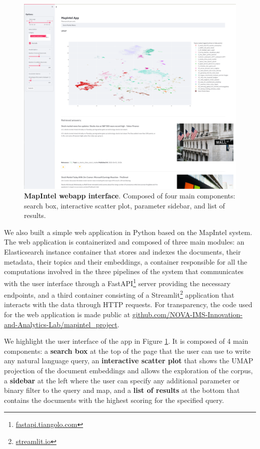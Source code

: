 \documentclass[a4paper]{article}
\begin{document}
\begin{figure}[H]
	\centering
	\includegraphics[scale=0.45]{./assets/ui_screenshot}
	\caption{\textbf{MapIntel webapp interface}. Composed of four main components: search box, interactive scatter plot, parameter sidebar, and list of results.}
	\label{app_ui}
\end{figure}

We also built a simple web application in Python based on the MapIntel system. The web application is containerized and composed of three main modules: an Elasticsearch instance container that stores and indexes the documents, their metadata, their topics and their embeddings, a container responsible for all the computations involved in the three pipelines of the system that communicates with the user interface through a FastAPI\footnote{\href{https://fastapi.tiangolo.com/}{fastapi.tiangolo.com}} server providing the necessary endpoints, and a third container consisting of a Streamlit\footnote{\href{https://streamlit.io/}{streamlit.io}} application that interacts with the data through HTTP requests. For transparency, the code used for the web application is made public at \href{https://github.com/NOVA-IMS-Innovation-and-Analytics-Lab/mapintel_project}{github.com/NOVA-IMS-Innovation-and-Analytics-Lab/mapintel\_project}.

We highlight the user interface of the app in Figure \ref{app_ui}. It is composed of 4 main components: a \textbf{search box} at the top of the page that the user can use to write any natural language query, an \textbf{interactive scatter plot} that shows the UMAP projection of the document embeddings and allows the exploration of the corpus, a \textbf{sidebar} at the left where the user can specify any additional parameter or binary filter to the query and map, and a \textbf{list of results} at the bottom that contains the documents with the highest scoring for the specified query.
\end{document}
